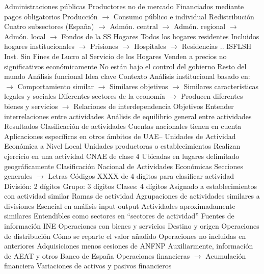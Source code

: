 \documentclass{nuevotema}
\begin{document}
\begin{esquemal}
				\4[S.13] Administraciones públicas
				\4[] Productores no de mercado
				\4[] Financiados mediante pagos obligatorios
				\4[] Producción
				\4[] $\to$ Consumo público e individual
				\4[] Redistribución
				\4[] Cuatro subsectores (España)
				\4[] $\to$ Admón. central
				\4[] $\to$ Admón. regional
				\4[] $\to$ Admón. local
				\4[] $\to$ Fondos de la SS
				\4[S.14] Hogares
				\4[] Todos los hogares residentes
				\4[] Incluidos hogares institucionales
				\4[] $\to$ Prisiones
				\4[] $\to$ Hospitales
				\4[] $\to$ Residencias
				\4[] ..
				\4[S.15] ISFLSH
				\4[] Inst. Sin Fines de Lucro al Servicio de los Hogares
				\4[] Venden a precios no significativos económicamente
				\4[] No están bajo el control del gobierno
				\4[S.2] Resto del mundo
		\2 Análisis funcional
			\3 Idea clave
				\4 Contexto
				\4[] Análisis institucional basado en:
				\4[] $\to$ Comportamiento similar
				\4[] $\to$ Similares objetivos
				\4[] $\to$ Similares características legales y sociales
				\4[] Diferentes sectores de la economía
				\4[] $\to$ Producen diferentes bienes y servicios
				\4[] $\to$ Relaciones de interdependencia
				\4 Objetivos
				\4[] Entender interrelaciones entre actividades
				\4[] Análisis de equilibrio general entre actividades
				\4 Resultados
				\4[] Clasificación de actividades
				\4[] Cuentas nacionales tienen en cuenta
				\4[] Aplicaciones específicas en otros ámbitos de
			\3 UAE-- Unidades de Actividad Económica a Nivel Local
				\4 Unidades productoras o establecimientos
				\4 Realizan ejercicio en una actividad CNAE de clase 4
				\4 Ubicadas en lugares delimitado geográficamente
			\3 Clasificación Nacional de Actividades Económicas
				 Secciones generales $\to$ Letras
				\4 Códigos XXXX de 4 dígitos para clasificar actividad
				\4[] División: 2 dígitos
				\4[] Grupo: 3 dígitos
				\4[] Clases: 4 dígitos
				\4 Asignado a establecimientos con actividad similar
			\3 Ramas de actividad
				\4 Agrupaciones de actividades similares a divisiones
				\4 Esencial en análisis input-output
				\4 Actividades aproximadamente similares
				\4[] Entendibles como sectores en ``sectores de actividad''
		\2 Fuentes de información
			\3 INE
				\4 Operaciones con bienes y servicios
				\4[] Destino y origen
				\4 Operaciones de distribución
				\4[] Cómo se reparte el valor añadido
				\4 Operaciones no incluidas en anteriores
				\4[] Adquisiciones menos cesiones de ANFNP
				\4 Auxiliarmente, información de AEAT y otros
			\3 Banco de España
				\4 Operaciones financieras
				\4[] $\to$ Acumulación financiera
				\4 Variaciones de activos y pasivos financieros

\end{esquemal}
\end{document}
